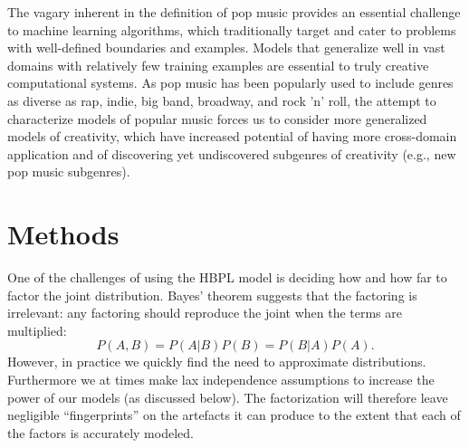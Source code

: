 \documentclass[letterpaper]{article}
\begin{document}


The vagary inherent in the definition of pop music provides an essential challenge to machine learning algorithms, which traditionally target and cater to problems with well-defined boundaries and examples. Models that generalize well in vast domains with relatively few training examples are essential to truly creative computational systems. As pop music has been popularly used to include genres as diverse as rap, indie, big band, broadway, and rock 'n' roll, the attempt to characterize models of popular music forces us to consider more generalized models of creativity, which have increased potential of having more cross-domain application and of discovering yet undiscovered subgenres of creativity (e.g., new pop music subgenres).

\section{Methods}

One of the challenges of using the HBPL model is deciding how and how far to factor the joint distribution. Bayes' theorem suggests that the factoring is irrelevant: any factoring should reproduce the joint when the terms are multiplied:
\[ P(A,B) = P(A|B)P(B) = P(B|A)P(A). \]
However, in practice we quickly find the need to approximate distributions. Furthermore we at times make lax independence assumptions to increase the power of our models (as discussed below). The factorization will therefore leave negligible ``fingerprints'' on the artefacts it can produce to the extent that each of the factors is accurately modeled.
\end{document}
